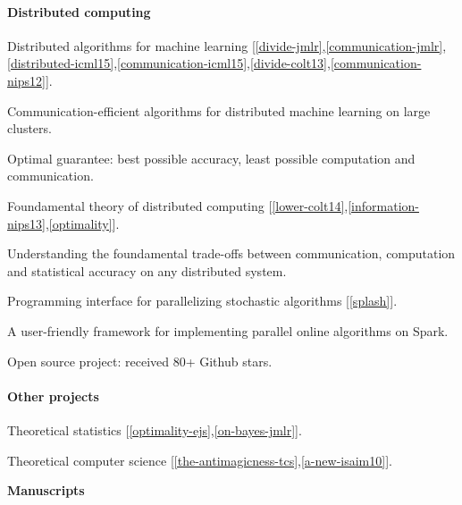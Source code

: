 \documentclass{res} %
\newenvironment{my_item}{
\begin{itemize}
  \setlength{\itemsep}{0pt}
  \setlength{\parskip}{0pt}
  \setlength{\parsep}{0pt}}
{\end{itemize}
}
\begin{document}
\begin{resume}
\vspace{-10pt}
\paragraph{Distributed computing}
\begin{my_item}
\item Distributed algorithms for machine learning [\ref{divide-jmlr},\ref{communication-jmlr},\ref{distributed-icml15},\ref{communication-icml15},\ref{divide-colt13},\ref{communication-nips12}].
\begin{my_item}
\item Communication-efficient algorithms for distributed machine learning on large clusters.
\item Optimal guarantee: best possible accuracy, least possible computation and communication.
\end{my_item}
\item Foundamental theory of distributed computing [\ref{lower-colt14},\ref{information-nips13},\ref{optimality}].
\begin{my_item}
\item Understanding the foundamental trade-offs between communication, computation and statistical accuracy on any distributed system.
\end{my_item}
\item Programming interface for parallelizing stochastic algorithms [\ref{splash}].
\begin{my_item}
\item A user-friendly framework for implementing parallel online algorithms on Spark.
\item Open source project: received 80+ Github stars.
\end{my_item}
\end{my_item}

\vspace{-10pt}
\paragraph{Other projects}
\begin{my_item}
\item Theoretical statistics [\ref{optimality-ejs},\ref{on-bayes-jmlr}].
\item Theoretical computer science [\ref{the-antimagicness-tcs},\ref{a-new-isaim10}].
\end{my_item}

{\bf\Large Manuscripts}
\vspace{5pt}


\end{resume}
\end{document}
